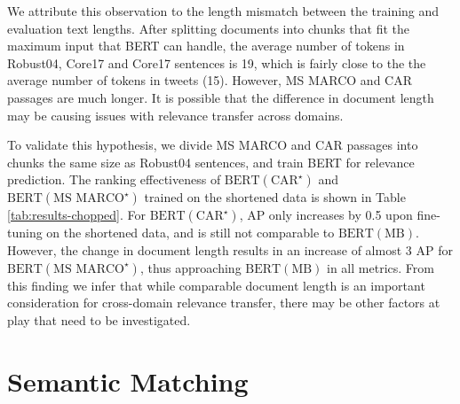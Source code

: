 We attribute this observation to the length mismatch between the training and evaluation text lengths.
After splitting documents into chunks that fit the maximum input that BERT can handle, the average number of tokens in Robust04, Core17 and Core17 sentences is 19, which is fairly close to the the average number of tokens in tweets (15).
However, MS MARCO and CAR passages are much longer.
It is possible that the difference in document length may be causing issues with relevance transfer across domains.

To validate this hypothesis, we divide MS MARCO and CAR passages into chunks the same size as Robust04 sentences, and train BERT for relevance prediction.
The ranking effectiveness of $ \textrm{BERT}(\textrm{CAR}^{\star}) $ and $ \textrm{BERT}(\textrm{MS MARCO}^{\star}) $ trained on the shortened data is shown in Table \ref{tab:results-chopped}.
For $ \textrm{BERT}(\textrm{CAR}^{\star}) $, AP only increases by 0.5 upon fine-tuning on the shortened data, and is still not comparable to $ \textrm{BERT}(\textrm{MB}) $.
However, the change in document length results in an increase of almost 3 AP for $ \textrm{BERT}(\textrm{MS MARCO}^{\star}) $, thus approaching $ \textrm{BERT}(\textrm{MB}) $ in all metrics.
From this finding we infer that while comparable document length is an important consideration for cross-domain relevance transfer, there may be other factors at play that need to be investigated.


\section{Semantic Matching}

\begin{table*}[t!]
\centering{}
\caption{Retrieval effectiveness on pruned Robust04.}
\label{tab:results-pruned}
\end{table*}

